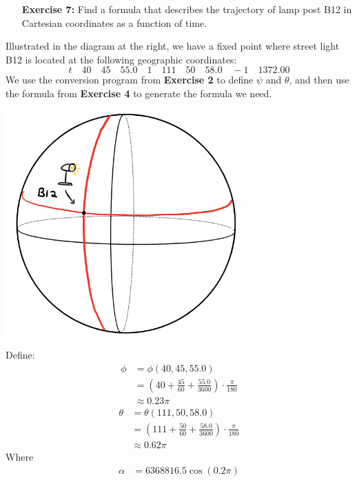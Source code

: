 \documentclass[11pt]{article}
\theoremstyle{definition}
\newcommand{\1}[1]{\mathbf{1} \left \{ #1 \right \}}
\begin{document}
\begin{itemize}
\item[{\textbf{Exercise 7:}}] Find a formula that describes the trajectory of lamp post B12 in Cartesian coordinates as a function of time.
\end{itemize}
\begin{minipage}{0.6\linewidth}
Illustrated in the diagram at the right, we have a fixed point where street light B12 is located at the following geographic coordinates:
\[t \quad 40 \quad 45 \quad 55.0 \quad 1 \quad 111 \quad 50 \quad 58.0 \quad -1 \quad 1372.00\]
We use the conversion program from \textbf{Exercise 2} to define $\psi$ and $\theta$, and then use the formula from \textbf{Exercise 4} to generate the formula we need.
\end{minipage} \qquad
\begin{minipage}{0.4\linewidth}
\includegraphics[width=0.2\textheight]{Images/M5600_7_light.PNG}
\end{minipage}
Define:
\begin{align*}
    \phi &= \phi(40, 45, 55.0) \\
    &= \left(40 + \frac{45}{60} + \frac{55.0}{3600}\right) \cdot \frac{\pi}{180} \\
    &\approx 0.23\pi
\end{align*}
\begin{align*}
    \theta &= \theta(111, 50, 58.0) \\
    &= \left(111 + \frac{50}{60} + \frac{58.0}{3600}\right) \cdot \frac{\pi}{180} \\
    &\approx 0.62\pi
\end{align*}
Where
\begin{align*}
    \alpha &= 6368816.5 \cos (0.2\pi)
\end{align*}
\end{document}
